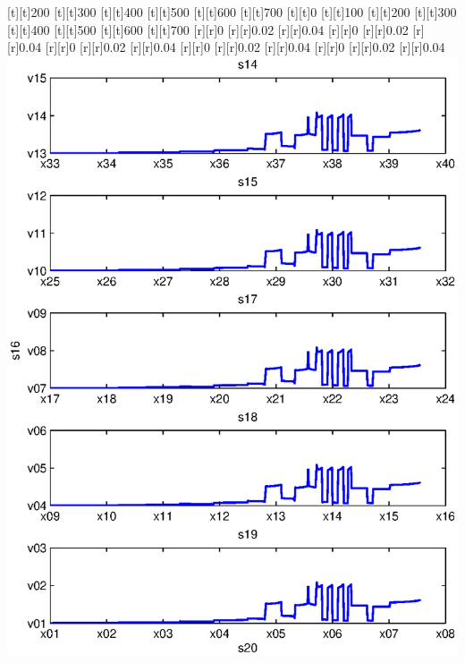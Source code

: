\begin{psfrags}
[t][t]{200}%
[t][t]{300}%
[t][t]{400}%
[t][t]{500}%
[t][t]{600}%
[t][t]{700}%
[t][t]{0}%
[t][t]{100}%
[t][t]{200}%
[t][t]{300}%
[t][t]{400}%
[t][t]{500}%
[t][t]{600}%
[t][t]{700}%
%
[r][r]{0}%
[r][r]{0.02}%
[r][r]{0.04}%
[r][r]{0}%
[r][r]{0.02}%
[r][r]{0.04}%
[r][r]{0}%
[r][r]{0.02}%
[r][r]{0.04}%
[r][r]{0}%
[r][r]{0.02}%
[r][r]{0.04}%
[r][r]{0}%
[r][r]{0.02}%
[r][r]{0.04}%
%
\includegraphics[width=15cm]{rmse_150_256.eps}%
\end{psfrags}%
%
